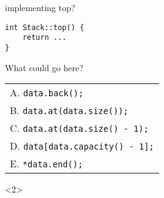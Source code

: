 \begin{frame}[fragile,label=vectorStackImplTop]{implementing top?}
\lstset{language=C++,style=small}
\begin{lstlisting}
int Stack::top() {
    return ...
}
\end{lstlisting}
What could go here? \\
    \begin{tabular}{l}
        A. \lstinline|data.back();| \\
        B. \lstinline|data.at(data.size());| \\
        C. \lstinline|data.at(data.size() - 1);|\\
        D. \lstinline|data[data.capacity() - 1];| \\
        E. \lstinline|*data.end();| \\
    \end{tabular}
\begin{visibleenv}<2>
\iftoggle{heldback}{}{
\\ \myemph{A or C} \\
 or \lstinline|data[data.size() - 1]| \\ or
    \lstinline|*(data.end() - 1);|
}
\end{visibleenv}
\end{frame}
